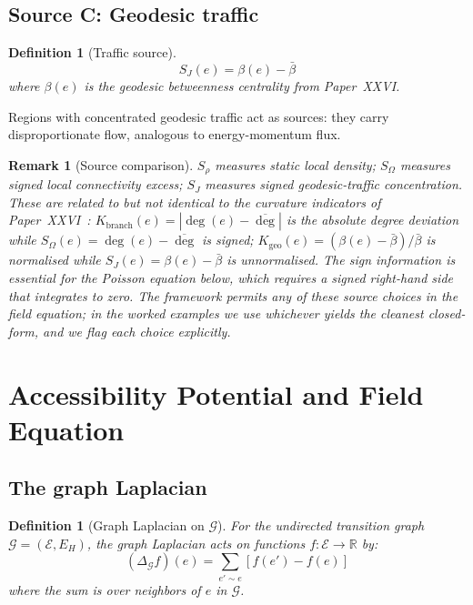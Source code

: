 \documentclass[12pt]{article}
\newtheorem{definition}[theorem]{Definition}
\newtheorem{remark}[theorem]{Remark}
\newcommand{\Ecal}{\mathcal{E}}
\newcommand{\Gcal}{\mathcal{G}}
\begin{document}
\subsection{Source C: Geodesic traffic}

\begin{definition}[Traffic source]\label{def:traffic}
\begin{equation}
    S_J(e) = \beta(e) - \bar{\beta}
\end{equation}
where $\beta(e)$ is the geodesic betweenness centrality from Paper~XXVI.
\end{definition}

Regions with concentrated geodesic traffic act as sources: they carry disproportionate flow, analogous to energy-momentum flux.

\begin{remark}[Source comparison]
$S_\rho$ measures static local density; $S_\Omega$ measures signed local connectivity excess; $S_J$ measures signed geodesic-traffic concentration. These are \emph{related to but not identical to} the curvature indicators of Paper~XXVI~\citep{SmartXXVI}: $K_{\mathrm{branch}}(e) = |\deg(e) - \overline{\deg}|$ is the \emph{absolute} degree deviation while $S_\Omega(e) = \deg(e) - \overline{\deg}$ is signed; $K_{\mathrm{geo}}(e) = (\beta(e) - \bar\beta)/\bar\beta$ is normalised while $S_J(e) = \beta(e) - \bar\beta$ is unnormalised. The sign information is essential for the Poisson equation below, which requires a signed right-hand side that integrates to zero. The framework permits any of these source choices in the field equation; in the worked examples we use whichever yields the cleanest closed-form, and we flag each choice explicitly.
\end{remark}

\section{Accessibility Potential and Field Equation}\label{sec:field}

\subsection{The graph Laplacian}

\begin{definition}[Graph Laplacian on $\Gcal$]\label{def:laplacian}
For the undirected transition graph $\Gcal = (\Ecal, E_H)$, the graph Laplacian acts on functions $f: \Ecal \to \mathbb{R}$ by:
\begin{equation}\label{eq:laplacian}
    (\Delta_\Gcal f)(e) = \sum_{e' \sim e} [f(e') - f(e)]
\end{equation}
where the sum is over neighbors of $e$ in $\Gcal$.
\end{definition}
\end{document}

